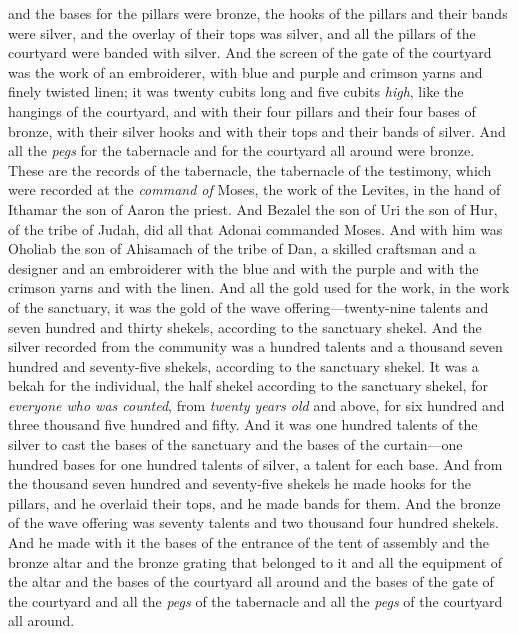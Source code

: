 \begin{biblechapter}
\verse and the bases for the pillars were bronze, the hooks of the pillars and their bands were silver, and the overlay of their tops was silver, and all the pillars of the courtyard were banded with silver.
\verse And the screen of the gate of the courtyard was the work of an embroiderer, with blue and purple and crimson yarns and finely twisted linen; it was twenty cubits long and five cubits \textit{high}, like the hangings of the courtyard,
\verse and with their four pillars and their four bases of bronze, with their silver hooks and with their tops and their bands of silver.
\verse And all the \textit{pegs} for the tabernacle and for the courtyard all around were bronze.
 These are the records of the tabernacle, the tabernacle of the testimony, which were recorded at the \textit{command of} Moses, the work of the Levites, in the hand of Ithamar the son of Aaron the priest.
\verse And Bezalel the son of Uri the son of Hur, of the tribe of Judah, did all that Adonai commanded Moses.
\verse And with him was Oholiab the son of Ahisamach of the tribe of Dan, a skilled craftsman and a designer and an embroiderer with the blue and with the purple and with the crimson yarns and with the linen.
\verse And all the gold used for the work, in the work of the sanctuary, it was the gold of the wave offering—twenty-nine talents and seven hundred and thirty shekels, according to the sanctuary shekel.
\verse And the silver recorded from the community was a hundred talents and a thousand seven hundred and seventy-five shekels, according to the sanctuary shekel.
\verse It was a bekah for the individual, the half shekel according to the sanctuary shekel, for \textit{everyone who was counted}, from \textit{twenty years old} and above, for six hundred and three thousand five hundred and fifty.
\verse And it was one hundred talents of the silver to cast the bases of the sanctuary and the bases of the curtain—one hundred bases for one hundred talents of silver, a talent for each base.
\verse And from the thousand seven hundred and seventy-five shekels he made hooks for the pillars, and he overlaid their tops, and he made bands for them.
\verse And the bronze of the wave offering was seventy talents and two thousand four hundred shekels.
\verse And he made with it the bases of the entrance of the tent of assembly and the bronze altar and the bronze grating that belonged to it and all the equipment of the altar
\verse and the bases of the courtyard all around and the bases of the gate of the courtyard and all the \textit{pegs} of the tabernacle and all the \textit{pegs} of the courtyard all around.
\end{biblechapter}

